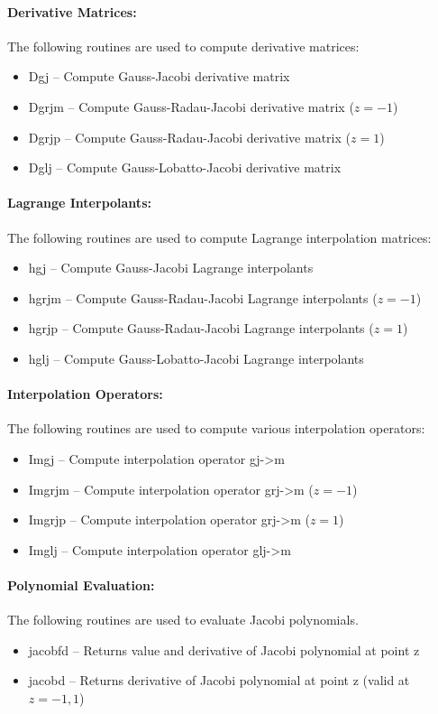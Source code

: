 \paragraph{Derivative Matrices: } The following routines are used to compute derivative matrices:

\begin{itemize}
\item  Dgj  --   Compute Gauss-Jacobi  derivative matrix
%
\item Dgrjm --   Compute Gauss-Radau-Jacobi  derivative matrix ($z=-1$)
%
\item  Dgrjp  --  Compute Gauss-Radau-Jacobi  derivative matrix ($z=1$)
%
\item  Dglj  --  Compute Gauss-Lobatto-Jacobi derivative matrix
\end{itemize}

\paragraph{Lagrange Interpolants: } The following routines are used to compute Lagrange interpolation matrices:

\begin{itemize}
\item hgj  --  Compute Gauss-Jacobi  Lagrange interpolants
%
\item hgrjm --  Compute Gauss-Radau-Jacobi  Lagrange interpolants ($z=-1$)
%
\item hgrjp --   Compute Gauss-Radau-Jacobi  Lagrange interpolants ($z=1$)
%
\item hglj  --   Compute Gauss-Lobatto-Jacobi Lagrange interpolants
\end{itemize}

\paragraph{Interpolation Operators: } The following routines are used to compute various interpolation operators:

\begin{itemize}
\item Imgj  --  Compute interpolation operator gj->m
%
\item Imgrjm  --  Compute interpolation operator grj->m ($z=-1$)
%
\item Imgrjp  --  Compute interpolation operator grj->m ($z=1$)
%
\item Imglj  --  Compute interpolation operator glj->m
\end{itemize}

\paragraph{Polynomial Evaluation: } The following routines are used to evaluate Jacobi polynomials.

\begin{itemize}
 \item jacobfd  --   Returns value and derivative of Jacobi polynomial at point z
%
 \item jacobd  --    Returns derivative of Jacobi polynomial at point z (valid at $z=-1,1$)
\end{itemize}
       